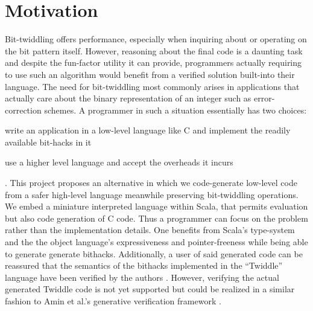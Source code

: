 \documentclass{article}
\begin{document}
\section{Motivation}
Bit-twiddling offers performance, especially when inquiring about or operating on the bit pattern itself. However, reasoning about the final code is a daunting task and despite the fun-factor utility it can provide, programmers actually requiring to use such an algorithm would benefit from a verified solution built-into their language. The need for bit-twiddling most commonly arises in applications that actually care about the binary representation of an integer such as error-correction schemes. A programmer in such a situation essentially has two choices:
\begin{enumerate*}[label=(\arabic*)]
	\item write an application in a low-level language like C and implement the readily available bit-hacks in it
	\item use a higher level language and accept the overheads it incurs
\end{enumerate*}. This project proposes an alternative in which we code-generate low-level code from a safer high-level language meanwhile preserving bit-twiddling operations. We embed a miniature interpreted language within Scala, that permits evaluation but also code generation of C code. Thus a programmer can focus on the problem rather than the implementation details. One benefits from Scala's type-system and the the object language's expressiveness and pointer-freeness while being able to generate generate bithacks. Additionally, a user of said generated code can be reassured that the semantics of the bithacks implemented in the ``Twiddle'' language have been verified by the authors \cite{anderson2005bit}. However, verifying the actual generated Twiddle code is not yet supported but could be realized in a similar fashion to Amin et al.'s generative verification framework \cite{amin2017lms}.

\pagebreak
\end{document}
